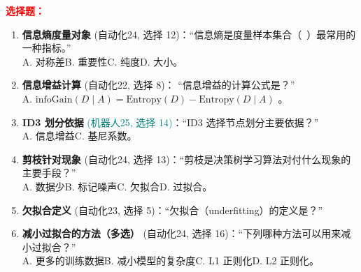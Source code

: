 ﻿\documentclass[../main.tex]{subfiles}
\begin{document}
\noindent\textbf{\textcolor{red}{选择题：}}
\begin{enumerate}[itemsep=0.45em, topsep=0.2em, leftmargin=1.5em]
    \item \textbf{信息熵度量对象} \textcolor{autoclassgreen}{(自动化24, 选择 12)}：``信息熵是度量样本集合（\ ）最常用的一种指标。''\\
    A. 对称差\quad B. 重要性\quad C. 纯度\quad D. 大小。 

    \item \textbf{信息增益计算} \textcolor{autoclassgreen}{(自动化22, 选择 8)}：
    ``信息增益的计算公式是？''\\
    A. $\mathrm{infoGain}(D\mid A)=\mathrm{Entropy}(D)-\mathrm{Entropy}(D\mid A)$\quad
    \quad
    \quad
    。

    \item \textbf{ID3 划分依据} \textcolor{teal}{(机器人25, 选择 14)}：``ID3 选择节点划分主要依据？''\\
    A. 信息增益\quad {}\quad C. 基尼系数\quad {}。 

    \item \textbf{剪枝针对现象} \textcolor{autoclassgreen}{(自动化24, 选择 13)}：``剪枝是决策树学习算法对付什么现象的主要手段？''\\
    A. 数据少\quad B. 标记噪声\quad C. 欠拟合\quad D. 过拟合。 

    \item \textbf{欠拟合定义} \textcolor{autoclassgreen}{(自动化23, 选择 5)}：``欠拟合（underfitting）的定义是？''\\
     

    \item \textbf{减小过拟合的方法（多选）} \textcolor{autoclassgreen}{(自动化24, 选择 16)}：``下列哪种方法可以用来减小过拟合？''\\
    A. 更多的训练数据\quad B. 减小模型的复杂度\quad C. L1 正则化\quad D. L2 正则化。 

\end{enumerate}
\end{document}
